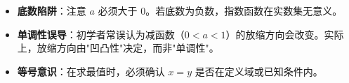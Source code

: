 \begin{trapbox}
\begin{itemize}
    \item \textbf{底数陷阱}：注意 $a$ 必须大于 0。若底数为负数，指数函数在实数集无意义。
    \item \textbf{单调性误导}：初学者常误认为减函数（$0<a<1$）的放缩方向会改变。实际上，放缩方向由"凹凸性"决定，而非"单调性"。
    \item \textbf{等号意识}：在求最值时，必须确认 $x=y$ 是否在定义域或已知条件内。
\end{itemize}
\end{trapbox}